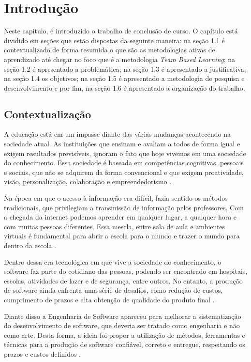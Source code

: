 \chapter[Introdução]{Introdução}

Neste capítulo, é introduzido o trabalho de conclusão de curso. O capítulo está dividido em seções que estão dispostas da seguinte maneira: na seção 1.1 é contextualizado de forma resumida o que são as metodologias ativas de aprendizado até chegar no foco que é a metodologia \textit{Team Based Learning}; na seção 1.2 é apresentado a problemática; na seção 1.3 é apresentado a justificativa; na seção 1.4 os objetivos; na seção 1.5 é apresentado a metodologia de pesquisa e desenvolvimento e por fim, na seção 1.6 é apresentado a organização do trabalho.


\section{Contextualização}

A educação está em um impasse diante das várias mudanças acontecendo na sociedade atual. As instituições que ensinam e avaliam a todos de forma igual e exigem resultados previsíveis, ignoram o fato que hoje vivemos em uma sociedade do conhecimento. Essa sociedade é baseada em competências cognitivas, pessoais e sociais, que não se adquirem da forma convencional e que exigem proatividade, visão, personalização, colaboração e empreendedorismo \cite{moran}.

Na época em que o acesso à informação era difícil, fazia sentido os métodos tradicionais, que privilegiam a transmissão de informação pelos professores. Com a chegada da internet podemos aprender em qualquer lugar, a qualquer hora e com muitas pessoas diferentes. Essa mescla, entre sala de aula e ambientes virtuais é fundamental para abrir a escola para o mundo e trazer o mundo para dentro da escola \cite{moran}.

Dentro dessa era tecnológica em que vive a sociedade do conhecimento, o software faz parte do cotidiano das pessoas, podendo ser encontrado em hospitais, escolas,  atividades de lazer e de segurança, entre outros.  No entanto, a produção de software ainda enfrenta uma série de desafios, como redução de custos, cumprimento de prazos e alta obtenção de qualidade do produto final \cite{silva}.

Diante disso a Engenharia de Software apareceu para melhorar a sistematização do desenvolvimento de software, que deveria ser tratado como engenharia e não como arte. Desta  forma, a ideia foi propor a utilização de métodos, ferramentas e técnicas para a produção de software confiável, correto e entregue, respeitando os prazos e custos definidos \cite{soares}.

